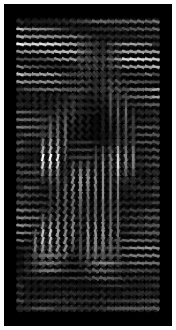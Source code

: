 \documentclass[thesis.tex]{subfiles}
\begin{document}
\begin{figure}[tb]
{\begin{subfigure}[t]{0.17\textwidth}
		\includegraphics[width=\textwidth]{img/inriaExampleDescriptor.pdf}
		\caption{}
		\label{fig:inriaExampleDescriptor}
		\vspace{2mm}
	\end{subfigure}
	\begin{subfigure}[t]{0.17\textwidth}

\end{subfigure}}
\end{figure}
\end{document}
